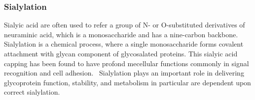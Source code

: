 \subsubsection {Sialylation}
Sialyic acid are often used to refer a group of N- or O-substituted derivatives of neuraminic acid, which is a monosaccharide and has a nine-carbon backbone.~\cite{Vocadlo_2009} Sialylation is a chemical process, where a single monosaccharide forms covalent attachment with glycan component of glycosalated proteins. This sialyic acid capping has been found to have profond mecellular functions commonly in signal recognition and cell adhesion.~\cite{Bhide_2016} Sialylation plays an important role in delivering glycoprotein function, stability, and metabolism in particular are dependent upon correct sialylation.